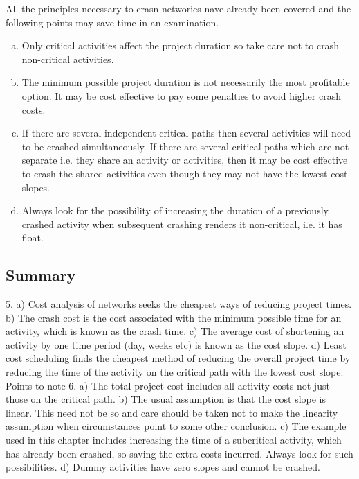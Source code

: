 \begin{itemize}
All the principles necessary to crasn networics nave already been covered and the following points may save time in an examination.
\begin{enumerate}[(a)]
\item Only critical activities affect the project duration so take care not to crash non-critical activities. 
\item The minimum possible project duration is not necessarily the most profitable option. It may be cost effective to pay some penalties to avoid higher crash costs. 
\item  If there are several independent critical paths then several activities will need to be crashed simultaneously. 
If there are several critical paths which are not separate i.e. they share an activity or activities, then it may be 
cost effective to crash the shared activities even though they may not have the lowest cost slopes. 
\item  Always look for the possibility of increasing the duration of a previously crashed activity when subsequent crashing renders it non-critical, i.e. it has float. 
\end{enumerate}
\subsection{Summary} 5. a) Cost analysis of networks seeks the cheapest ways of reducing project times. b) The crash cost is the cost associated with the minimum possible time for an activity, which is known as the crash time. c) The average cost of shortening an activity by one time period (day, weeks etc) is known as the cost slope. d) Least cost scheduling finds the cheapest method of reducing the overall project time by reducing the time of the activity on the critical path with the lowest cost slope. 
Points to note 6. a) The total project cost includes all activity costs not just those on the critical path. 
b) The usual assumption is that the cost slope is linear. This need not be so and care should be taken not to make the 
linearity assumption when circumstances point to some other conclusion. c) The example used in this chapter includes increasing 
the time of a subcritical activity, which has already been crashed, so saving the extra costs incurred. Always look for such possibilities. 
d) Dummy activities have zero slopes and cannot be crashed. 

\end{itemize}
